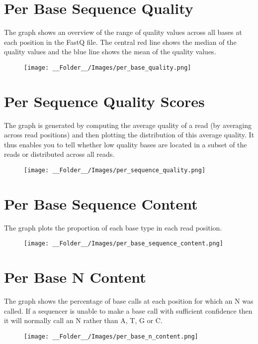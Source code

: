 \documentclass[a4paper, 12pt]{article}
\begin{document}
\newpage
\section {Per Base Sequence Quality}
The graph shows an overview of the range of quality values across all bases at each position in the FastQ file. The central red line shows the median of the quality values and the blue line shows the mean of the quality values.
\begin{figure}[H]
\centering
\texttt{[image: \_\_Folder\_\_/Images/per\_base\_quality.png]}
\end{figure}

\section{Per Sequence Quality Scores}
The graph is generated by computing the average quality of a read (by averaging across read positions) and then plotting the distribution of this average quality. It thus enables you to tell whether low quality bases are located in a subset of the reads or distributed across all reads.

\begin{figure}[H]
\centering
\texttt{[image: \_\_Folder\_\_/Images/per\_sequence\_quality.png]}
\end{figure}

\newpage
\section{Per Base Sequence Content}
The graph plots the proportion of each base type in each read position. 
\begin{figure}[H]
\centering
\texttt{[image: \_\_Folder\_\_/Images/per\_base\_sequence\_content.png]}
\end{figure}

\section{Per Base N Content}
The graph shows the percentage of base calls at each position for which an N was called. If a sequencer is unable to make a base call with sufficient confidence then it will normally call an N rather than A, T, G or C. 
\begin{figure}[H]
\centering
\texttt{[image: \_\_Folder\_\_/Images/per\_base\_n\_content.png]}
\end{figure}
\end{document}
